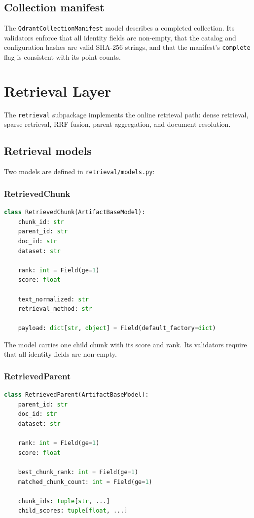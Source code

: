 \documentclass[11pt,a4paper]{article}
\begin{document}
\subsection{Collection manifest}
The \texttt{QdrantCollectionManifest} model describes a completed
collection. Its validators enforce that all identity fields are
non-empty, that the catalog and configuration hashes are valid
SHA-256 strings, and that the manifest's \texttt{complete} flag is
consistent with its point counts.

\section{Retrieval Layer}\label{sec:retrieval}

The \texttt{retrieval} subpackage implements the online retrieval
path: dense retrieval, sparse retrieval, RRF fusion, parent
aggregation, and document resolution.

\subsection{Retrieval models}
Two models are defined in \texttt{retrieval/models.py}:

\subsubsection{RetrievedChunk}
\begin{lstlisting}[language=python]
class RetrievedChunk(ArtifactBaseModel):
    chunk_id: str
    parent_id: str
    doc_id: str
    dataset: str

    rank: int = Field(ge=1)
    score: float

    text_normalized: str
    retrieval_method: str

    payload: dict[str, object] = Field(default_factory=dict)
\end{lstlisting}

The model carries one child chunk with its score and rank. Its
validators require that all identity fields are non-empty.

\subsubsection{RetrievedParent}
\begin{lstlisting}[language=python]
class RetrievedParent(ArtifactBaseModel):
    parent_id: str
    doc_id: str
    dataset: str

    rank: int = Field(ge=1)
    score: float

    best_chunk_rank: int = Field(ge=1)
    matched_chunk_count: int = Field(ge=1)

    chunk_ids: tuple[str, ...]
    child_scores: tuple[float, ...]
\end{lstlisting}
\end{document}
